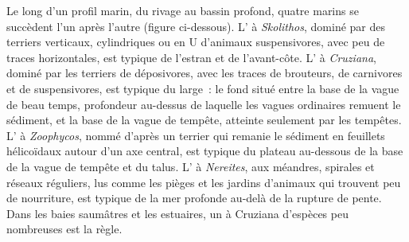 Le long d'un profil marin, du rivage au bassin profond, quatre  marins se succèdent l'un
après l'autre (figure ci-dessous). L' à \emph{Skolithos}, dominé par des terriers verticaux,
cylindriques ou en U d'animaux suspensivores, avec peu de traces horizontales, est typique de l'estran
et de l'avant-côte. L' à \emph{Cruziana}, dominé par les terriers de déposivores, avec les
traces de brouteurs, de carnivores et de suspensivores, est typique du large~: le fond situé entre la
base de la vague de beau temps, profondeur au-dessus de laquelle les vagues ordinaires remuent le sédiment,
et la base de la vague de tempête, atteinte seulement par les tempêtes. L' à \emph{Zoophycos},
nommé d'après un terrier qui remanie le sédiment en feuillets hélicoïdaux autour d'un axe central,
est typique du plateau au-dessous de la base de la vague de tempête et du talus. L' à
\emph{Nereites}, aux méandres, spirales et réseaux réguliers, lus comme les pièges et les jardins d'animaux
qui trouvent peu de nourriture, est typique de la mer profonde au-delà de la rupture de pente. Dans
les baies saumâtres et les estuaires, un  à Cruziana d'espèces peu nombreuses est la règle.


